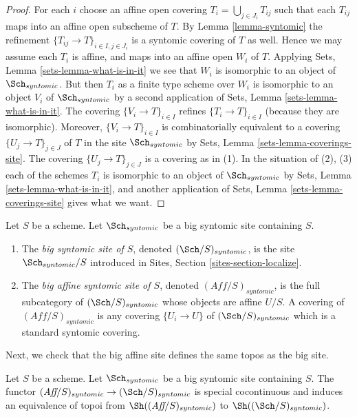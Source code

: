 \begin{proof}
For each $i$ choose an affine open covering $T_i = \bigcup_{j \in J_i} T_{ij}$
such that each $T_{ij}$ maps into an affine open subscheme of $T$. By
Lemma \ref{lemma-syntomic}
the refinement $\{T_{ij} \to T\}_{i \in I, j \in J_i}$ is a syntomic covering
of $T$ as well. Hence we may assume each $T_i$ is affine, and maps into
an affine open $W_i$ of $T$. Applying
Sets, Lemma \ref{sets-lemma-what-is-in-it}
we see that $W_i$ is isomorphic to an object of $\Sch_{syntomic}$.
But then $T_i$ as a finite type scheme over $W_i$
is isomorphic to an object $V_i$ of $\Sch_{syntomic}$ by a second
application of
Sets, Lemma \ref{sets-lemma-what-is-in-it}.
The covering $\{V_i \to T\}_{i \in I}$ refines $\{T_i \to T\}_{i \in I}$
(because they are isomorphic).
Moreover, $\{V_i \to T\}_{i \in I}$ is combinatorially equivalent to a
covering $\{U_j \to T\}_{j \in J}$ of $T$ in the site
$\Sch_{syntomic}$ by
Sets, Lemma \ref{sets-lemma-coverings-site}.
The covering $\{U_j \to T\}_{j \in J}$ is a covering as in (1).
In the situation of (2), (3) each of the
schemes $T_i$ is isomorphic to an object of $\Sch_{syntomic}$ by
Sets, Lemma \ref{sets-lemma-what-is-in-it},
and another application of
Sets, Lemma \ref{sets-lemma-coverings-site}
gives what we want.
\end{proof}

\begin{definition}
\label{definition-big-small-syntomic}
Let $S$ be a scheme. Let $\Sch_{syntomic}$ be a big syntomic
site containing $S$.
\begin{enumerate}
\item The {\it big syntomic site of $S$}, denoted
$(\Sch/S)_{syntomic}$, is the site $\Sch_{syntomic}/S$
introduced in Sites, Section \ref{sites-section-localize}.
\item The {\it big affine syntomic site of $S$}, denoted
$(\textit{Aff}/S)_{syntomic}$, is the full subcategory of
$(\Sch/S)_{syntomic}$ whose objects are affine $U/S$.
A covering of $(\textit{Aff}/S)_{syntomic}$ is any covering
$\{U_i \to U\}$ of $(\Sch/S)_{syntomic}$ which is a
standard syntomic covering.
\end{enumerate}
\end{definition}

\noindent
Next, we check that the big affine site defines the same
topos as the big site.

\begin{lemma}
\label{lemma-affine-big-site-syntomic}
Let $S$ be a scheme. Let $\Sch_{syntomic}$ be a big syntomic
site containing $S$.
The functor
$(\textit{Aff}/S)_{syntomic} \to (\Sch/S)_{syntomic}$
is special cocontinuous and induces an equivalence of topoi from
$\Sh((\textit{Aff}/S)_{syntomic})$ to
$\Sh((\Sch/S)_{syntomic})$.
\end{lemma}

